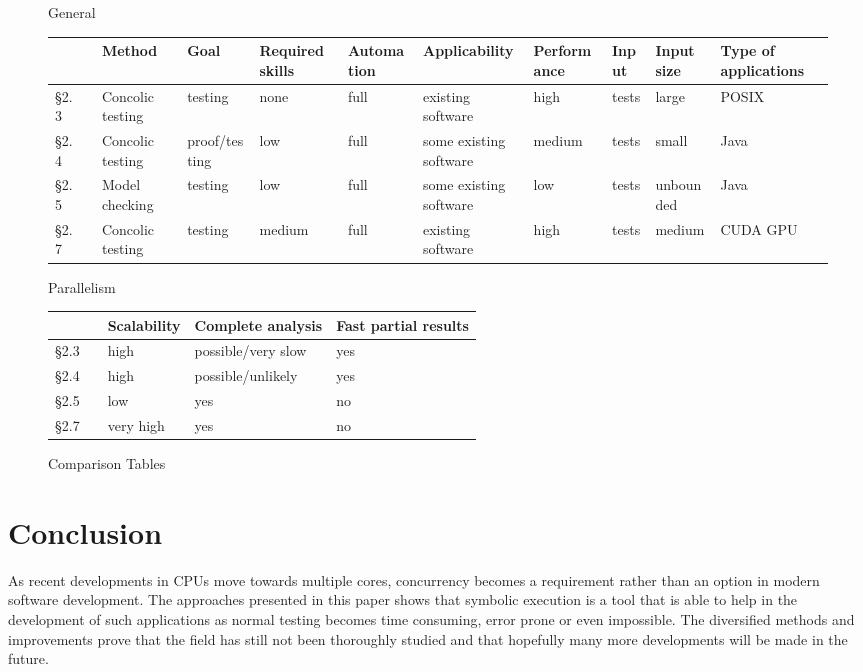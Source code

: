 \documentclass[10pt]{llncs}
\begin{document}
\begin{landscape}
\begin{figure}
	
	\vspace{1cm}
	
	General
	
	\vspace{5mm}
	
	\begin{tabular}{l l l l l l l l l l l}
		& & Method & Goal & Required skills & Automation & Applicability & Performance & Input & Input size & Type of applications \\
		\hline
		§2.3 & \cite{base3} & Concolic testing & testing & none & full & existing software & high & tests & large & POSIX \\
		§2.4 & \cite{base4} & Concolic testing & proof/testing & low & full & some existing software & medium & tests & small & Java \\
		§2.5 & \cite{base5} & Model checking & testing & low & full & some existing software & low & tests & unbounded & Java \\
		§2.7 & \cite{base7} & Concolic testing & testing & medium & full & existing software & high & tests & medium & CUDA GPU
	\end{tabular}
	
	\vspace{1cm}
	
	Parallelism
	
	\vspace{5mm}
	
	\begin{tabular}{l l l l l}
		& & Scalability & Complete analysis & Fast partial results\\
		\hline
		§2.3 & \cite{base3} & high & possible/very slow & yes \\
		§2.4 & \cite{base4} & high & possible/unlikely & yes\\
		§2.5 & \cite{base5} & low & yes & no \\
		§2.7 & \cite{base7} & very high & yes & no \\
	\end{tabular}
	
	\caption{Comparison Tables}
	\label{comp table}
\end{figure}
\end{landscape}

\section{Conclusion}
\label{conclusion}

As recent developments in CPUs move towards multiple cores, concurrency becomes a requirement rather than an option in modern software development. The approaches presented in this paper shows that symbolic execution is a tool that is able to help in the development of such applications as normal testing becomes time consuming, error prone or even impossible. The diversified methods and improvements prove that the field has still not been thoroughly studied and that hopefully many more developments will be made in the future.



\end{document}

